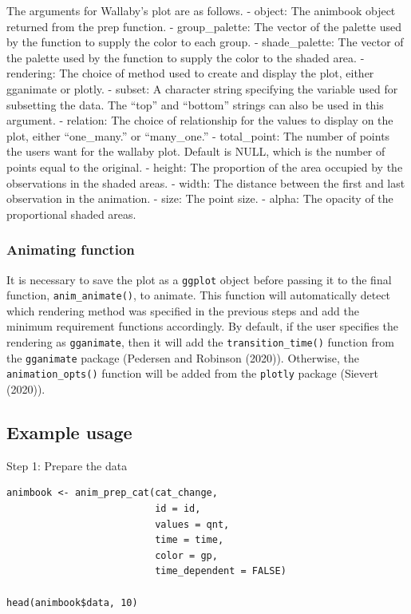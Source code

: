 The arguments for Wallaby's plot are as follows.
- object: The animbook object returned from the prep function.
- group\_palette: The vector of the palette used by the function to supply the color to each group.
- shade\_palette: The vector of the palette used by the function to supply the color to the shaded area.
- rendering: The choice of method used to create and display the plot, either gganimate or plotly.
- subset: A character string specifying the variable used for subsetting the data. The ``top'' and ``bottom'' strings can also be used in this argument.
- relation: The choice of relationship for the values to display on the plot, either ``one\_many.'' or ``many\_one.''
- total\_point: The number of points the users want for the wallaby plot. Default is NULL, which is the number of points equal to the original.
- height: The proportion of the area occupied by the observations in the shaded areas.
- width: The distance between the first and last observation in the animation.
- size: The point size.
- alpha: The opacity of the proportional shaded areas.

\hypertarget{animating-function}{%
\subsubsection{Animating function}\label{animating-function}}

It is necessary to save the plot as a \texttt{ggplot} object before passing it to the final function, \texttt{anim\_animate()}, to animate. This function will automatically detect which rendering method was specified in the previous steps and add the minimum requirement functions accordingly. By default, if the user specifies the rendering as \texttt{gganimate}, then it will add the \texttt{transition\_time()} function from the \texttt{gganimate} package (Pedersen and Robinson (2020)). Otherwise, the \texttt{animation\_opts()} function will be added from the \texttt{plotly} package (Sievert (2020)).

\hypertarget{example-usage}{%
\subsection{Example usage}\label{example-usage}}

Step 1: Prepare the data

\begin{verbatim}
animbook <- anim_prep_cat(cat_change, 
                          id = id, 
                          values = qnt, 
                          time = time, 
                          color = gp, 
                          time_dependent = FALSE)

head(animbook$data, 10)
\end{verbatim}

